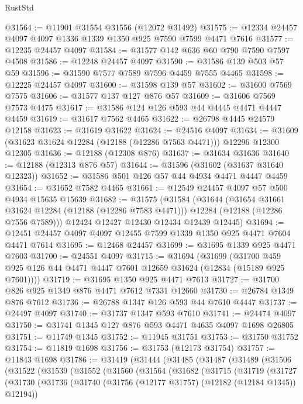 \begin{lexlean}{RustStd}
\begin{coremodule}
@31564 := @11901 @31554 @31556 (@12072 @31492)
@31575 := @12334 @24457 @4097 @4097 @1336 @1339 @1350 @925 @7590 @7599 @4471 @7616
@31577 := @12235 @24457 @4097
@31584 := @31577 @142 @636 @60 @790 @7590 @7597 @4508
@31586 := @12248 @24457 @4097
@31590 := @31586 @139 @503 @57 @59
@31596 := @31590 @7577 @7589 @7596 @4459 @7555 @4465
@31598 := @12225 @24457 @4097
@31600 := @31598 @139 @57
@31602 := @31600 @7569 @7575
@31606 := @31577 @137 @127 @876 @57
@31609 := @31606 @7569 @7573 @4475
@31617 := @31586 @124 @126 @593 @44 @4445 @4471 @4447 @4459
@31619 := @31617 @7562 @4465
@31622 := @26798 @4445 @24579 @12158
@31623 := @31619 @31622
@31624 := @24516 @4097
@31634 := @31609 (@31623 @31624 @12284 (@12188 (@12286 @7563 @4471))) @12296 @12300 @12305
@31636 := @12188 (@12308 @876)
@31637 := @31634 @31636
@31640 := @12188 (@12313 @876 @57)
@31644 := @31596 (@31602 (@31637 @31640 @12323))
@31652 := @31586 @501 @126 @57 @44 @4934 @4471 @4447 @4459
@31654 := @31652 @7582 @4465
@31661 := @12549 @24457 @4097 @57 @500 @4934 @15635 @15639
@31682 := @31575
    (@31584
      (@31644
        (@31654 @31661 @31624 @12284 (@12188 (@12286 @7583 @4471)))
        @12284
        (@12188 (@12286 @7556 @7589)))
      @12424
      @12427
      @12430
      @12434
      @12439
      @12445)
@31694 := @12451 @24457 @4097 @4097 @12455 @7599 @1339 @1350 @925 @4471 @7604 @4471 @7614
@31695 := @12468 @24457
@31699 := @31695 @1339 @925 @4471 @7603
@31700 := @24551 @4097
@31715 := @31694
    (@31699
      (@31700 @459 @925 @126 @44 @4471 @4447 @7601 @12659 @31624 (@12834 (@15189 @925 @7601))))
@31719 := @31695 @1350 @925 @4471 @7613
@31727 := @31700 @826 @925 @1349 @876 @4471 @7612 @7331 @12660
@31730 := @26784 @1349 @876 @7612
@31736 := @26788 @1347 @126 @593 @44 @7610 @4447
@31737 := @24497 @4097
@31740 := @31737 @1347 @593 @7610
@31741 := @24474 @4097
@31750 := @31741 @1345 @127 @876 @593 @4471 @4635 @4097 @1698 @26805
@31751 := @11749 @1345
@31752 := @11945 @31751
@31753 := @31750 @31752
@31754 := @11819 @1698
@31756 := @31753 (@12173 @31754)
@31757 := @11843 @1698
@31786 := @31419
    (@31444
      (@31485
        (@31487
          (@31489
            (@31506
              (@31522
                (@31539
                  (@31552
                    (@31560
                      (@31564
                        (@31682
                          (@31715
                            (@31719
                              (@31727
                                (@31730
                                  (@31736
                                    (@31740 (@31756 (@12177 @31757) (@12182 (@12184 @1345)) @12194))

\end{coremodule}
\end{lexlean}
